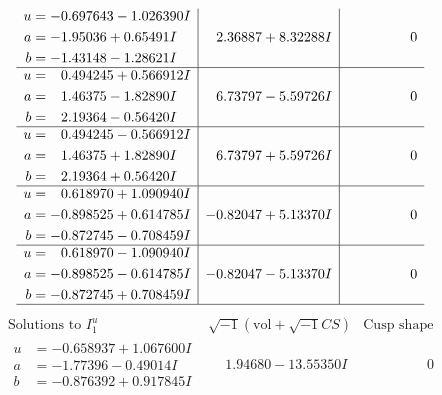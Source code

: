\documentclass[1p]{elsarticle_modified}
\theoremstyle{definition}
\newcommand{\I}{\sqrt{-1}}
\begin{document}
$$\begin{array}{c|c|c}
\begin{aligned}
u &= -0.697643 - 1.026390 I \\
a &= -1.95036 + 0.65491 I \\
b &= -1.43148 - 1.28621 I\end{aligned}
 & \phantom{-}2.36887 + 8.32288 I & \phantom{-0.000000 } 0 \\ \hline\begin{aligned}
u &= \phantom{-}0.494245 + 0.566912 I \\
a &= \phantom{-}1.46375 - 1.82890 I \\
b &= \phantom{-}2.19364 - 0.56420 I\end{aligned}
 & \phantom{-}6.73797 - 5.59726 I & \phantom{-0.000000 } 0 \\ \hline\begin{aligned}
u &= \phantom{-}0.494245 - 0.566912 I \\
a &= \phantom{-}1.46375 + 1.82890 I \\
b &= \phantom{-}2.19364 + 0.56420 I\end{aligned}
 & \phantom{-}6.73797 + 5.59726 I & \phantom{-0.000000 } 0 \\ \hline\begin{aligned}
u &= \phantom{-}0.618970 + 1.090940 I \\
a &= -0.898525 + 0.614785 I \\
b &= -0.872745 - 0.708459 I\end{aligned}
 & -0.82047 + 5.13370 I & \phantom{-0.000000 } 0 \\ \hline\begin{aligned}
u &= \phantom{-}0.618970 - 1.090940 I \\
a &= -0.898525 - 0.614785 I \\
b &= -0.872745 + 0.708459 I\end{aligned}
 & -0.82047 - 5.13370 I & \phantom{-0.000000 } 0\\
 \hline 
 \end{array}$$\newpage$$\begin{array}{c|c|c}  
\text{Solutions to }I^u_{1}& \I (\text{vol} + \sqrt{-1}CS) & \text{Cusp shape}\\
 \hline 
\begin{aligned}
u &= -0.658937 + 1.067600 I \\
a &= -1.77396 - 0.49014 I \\
b &= -0.876392 + 0.917845 I\end{aligned}
 & \phantom{-}1.94680 - 13.55350 I & \phantom{-0.000000 } 0 \\ \hline\begin{aligned}

\end{aligned}
\end{array}$$
\end{document}

